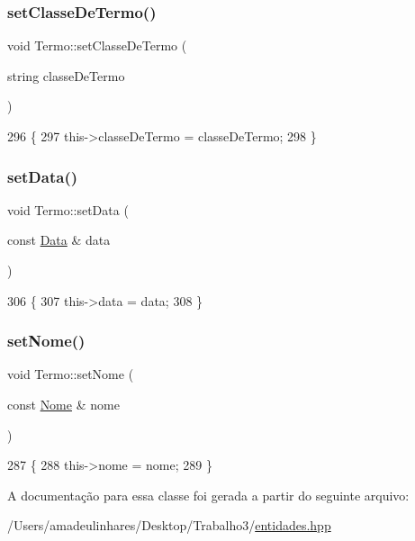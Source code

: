 \subsubsection{\texorpdfstring{set\+Classe\+De\+Termo()}{setClasseDeTermo()}}
{\footnotesize\ttfamily void Termo\+::set\+Classe\+De\+Termo (\begin{DoxyParamCaption}\item[{string}]{classe\+De\+Termo }\end{DoxyParamCaption})\hspace{0.3cm}{\ttfamily [inline]}}


\begin{DoxyCode}
296   \{
297     this->classeDeTermo = classeDeTermo;
298   \}
\end{DoxyCode}
\mbox{\label{class_termo_abf829a90ed067a580bb9d4c90db0f160}} 
\subsubsection{\texorpdfstring{set\+Data()}{setData()}}
{\footnotesize\ttfamily void Termo\+::set\+Data (\begin{DoxyParamCaption}\item[{const \mbox{\hyperlink{class_data}{Data}} \&}]{data }\end{DoxyParamCaption})\hspace{0.3cm}{\ttfamily [inline]}}


\begin{DoxyCode}
306   \{
307     this->data = data;
308   \}
\end{DoxyCode}
\mbox{\label{class_termo_a43246196cccd6fa074731e93ac15f07a}} 
\subsubsection{\texorpdfstring{set\+Nome()}{setNome()}}
{\footnotesize\ttfamily void Termo\+::set\+Nome (\begin{DoxyParamCaption}\item[{const \mbox{\hyperlink{class_nome}{Nome}} \&}]{nome }\end{DoxyParamCaption})\hspace{0.3cm}{\ttfamily [inline]}}


\begin{DoxyCode}
287   \{
288     this->nome = nome;
289   \}
\end{DoxyCode}


A documentação para essa classe foi gerada a partir do seguinte arquivo\+:\begin{DoxyCompactItemize}
\item 
/\+Users/amadeulinhares/\+Desktop/\+Trabalho3/\mbox{\hyperlink{entidades_8hpp}{entidades.\+hpp}}\end{DoxyCompactItemize}
